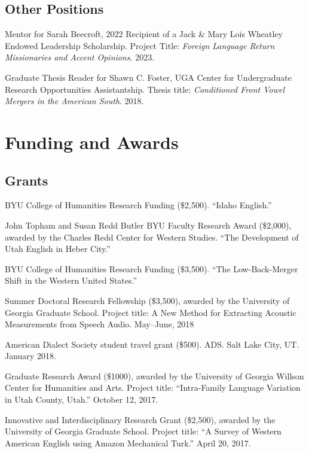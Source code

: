 \documentclass[
]{article}
\begin{document}
\hypertarget{other-positions}{%
\subsection{Other Positions}\label{other-positions}}

Mentor for Sarah Beecroft, 2022 Recipient of a Jack \& Mary Lois
Wheatley Endowed Leadership Scholarship. Project Title: \emph{Foreign
Language Return Missionaries and Accent Opinions}. 2023.

Graduate Thesis Reader for Shawn C. Foster, UGA Center for Undergraduate
Research Opportunities Assistantship. Thesis title: \emph{Conditioned
Front Vowel Mergers in the American South}. 2018.

\hypertarget{funding-and-awards}{%
\section{Funding and Awards}\label{funding-and-awards}}

\hypertarget{grants}{%
\subsection{Grants}\label{grants}}

BYU College of Humanities Research Funding (\$2,500). ``Idaho English.''

John Topham and Susan Redd Butler BYU Faculty Research Award (\$2,000),
awarded by the Charles Redd Center for Western Studies. ``The
Development of Utah English in Heber City.''

BYU College of Humanities Research Funding (\$3,500). ``The
Low-Back-Merger Shift in the Western United States.''

Summer Doctoral Research Fellowship (\$3,500), awarded by the University
of Georgia Graduate School. Project title: A New Method for Extracting
Acoustic Measurements from Speech Audio. May--June, 2018

American Dialect Society student travel grant (\$500). ADS. Salt Lake
City, UT. January 2018.

Graduate Research Award (\$1000), awarded by the University of Georgia
Willson Center for Humanities and Arts. Project title: ``Intra-Family
Language Variation in Utah County, Utah.'' October 12, 2017.

Innovative and Interdisciplinary Research Grant (\$2,500), awarded by
the University of Georgia Graduate School. Project title: ``A Survey of
Western American English using Amazon Mechanical Turk.'' April 20, 2017.
\end{document}
